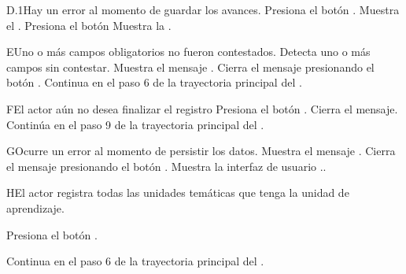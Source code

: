 
\begin{UCtrayectoriaA}{D.1}{Hay un error al momento de guardar los avances.}
\UCpaso[\UCactor] Presiona el botón .
\UCpaso Muestra el .
\UCpaso[\UCactor] Presiona el botón  
\UCpaso Muestra la .
\end{UCtrayectoriaA}


\begin{UCtrayectoriaA}{E}{Uno o más campos obligatorios no fueron contestados.}
	\UCpaso Detecta uno o más campos sin contestar.
    \UCpaso Muestra el mensaje .
    \UCpaso[\UCactor] Cierra el mensaje presionando el botón .
    \UCpaso Continua en el paso 6 de la trayectoria principal del .
\end{UCtrayectoriaA}


\begin{UCtrayectoriaA}{F}{El actor aún no desea finalizar el registro}
	\UCpaso[\UCactor] Presiona el botón .
	\UCpaso Cierra el mensaje.
	\UCpaso Continúa en el paso 9 de la trayectoria principal del .
\end{UCtrayectoriaA}


\begin{UCtrayectoriaA}{G}{Ocurre un error al momento de persistir los datos.}
	\UCpaso Muestra el mensaje .
	\UCpaso[\UCactor] Cierra el mensaje presionando el botón .
	\UCpaso Muestra la interfaz de usuario ..
\end{UCtrayectoriaA}



\begin{UCtrayectoriaA}{H}{El actor registra todas las unidades temáticas que tenga la unidad de aprendizaje.}

\UCpaso[\UCactor] Presiona el botón \IUbutton{$\succ$}.

\UCpaso Continua en el paso 6 de la trayectoria principal del .
\end{UCtrayectoriaA}
